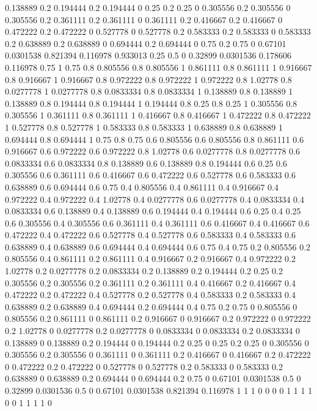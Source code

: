 0.138889 0.2
0.194444 0.2
0.194444 0
0.25 0.2
0.25 0
0.305556 0.2
0.305556 0
0.305556 0.2
0.361111 0.2
0.361111 0
0.361111 0.2
0.416667 0.2
0.416667 0
0.472222 0.2
0.472222 0
0.527778 0
0.527778 0.2
0.583333 0.2
0.583333 0
0.583333 0.2
0.638889 0.2
0.638889 0
0.694444 0.2
0.694444 0
0.75 0.2
0.75 0
0.67101 0.0301538
0.821394 0.116978
0.933013 0.25
0.5 0
0.32899 0.0301536
0.178606 0.116978
0.75 1
0.75 0.8
0.805556 0.8
0.805556 1
0.861111 0.8
0.861111 1
0.916667 0.8
0.916667 1
0.916667 0.8
0.972222 0.8
0.972222 1
0.972222 0.8
1.02778 0.8
0.0277778 1
0.0277778 0.8
0.0833334 0.8
0.0833334 1
0.138889 0.8
0.138889 1
0.138889 0.8
0.194444 0.8
0.194444 1
0.194444 0.8
0.25 0.8
0.25 1
0.305556 0.8
0.305556 1
0.361111 0.8
0.361111 1
0.416667 0.8
0.416667 1
0.472222 0.8
0.472222 1
0.527778 0.8
0.527778 1
0.583333 0.8
0.583333 1
0.638889 0.8
0.638889 1
0.694444 0.8
0.694444 1
0.75 0.8
0.75 0.6
0.805556 0.6
0.805556 0.8
0.861111 0.6
0.916667 0.6
0.972222 0.6
0.972222 0.8
1.02778 0.6
0.0277778 0.8
0.0277778 0.6
0.0833334 0.6
0.0833334 0.8
0.138889 0.6
0.138889 0.8
0.194444 0.6
0.25 0.6
0.305556 0.6
0.361111 0.6
0.416667 0.6
0.472222 0.6
0.527778 0.6
0.583333 0.6
0.638889 0.6
0.694444 0.6
0.75 0.4
0.805556 0.4
0.861111 0.4
0.916667 0.4
0.972222 0.4
0.972222 0.4
1.02778 0.4
0.0277778 0.6
0.0277778 0.4
0.0833334 0.4
0.0833334 0.6
0.138889 0.4
0.138889 0.6
0.194444 0.4
0.194444 0.6
0.25 0.4
0.25 0.6
0.305556 0.4
0.305556 0.6
0.361111 0.4
0.361111 0.6
0.416667 0.4
0.416667 0.6
0.472222 0.4
0.472222 0.6
0.527778 0.4
0.527778 0.6
0.583333 0.4
0.583333 0.6
0.638889 0.4
0.638889 0.6
0.694444 0.4
0.694444 0.6
0.75 0.4
0.75 0.2
0.805556 0.2
0.805556 0.4
0.861111 0.2
0.861111 0.4
0.916667 0.2
0.916667 0.4
0.972222 0.2
1.02778 0.2
0.0277778 0.2
0.0833334 0.2
0.138889 0.2
0.194444 0.2
0.25 0.2
0.305556 0.2
0.305556 0.2
0.361111 0.2
0.361111 0.4
0.416667 0.2
0.416667 0.4
0.472222 0.2
0.472222 0.4
0.527778 0.2
0.527778 0.4
0.583333 0.2
0.583333 0.4
0.638889 0.2
0.638889 0.4
0.694444 0.2
0.694444 0.4
0.75 0.2
0.75 0
0.805556 0
0.805556 0.2
0.861111 0
0.861111 0.2
0.916667 0
0.916667 0.2
0.972222 0
0.972222 0.2
1.02778 0
0.0277778 0.2
0.0277778 0
0.0833334 0
0.0833334 0.2
0.0833334 0
0.138889 0
0.138889 0.2
0.194444 0
0.194444 0.2
0.25 0
0.25 0.2
0.25 0
0.305556 0
0.305556 0.2
0.305556 0
0.361111 0
0.361111 0.2
0.416667 0
0.416667 0.2
0.472222 0
0.472222 0.2
0.472222 0
0.527778 0
0.527778 0.2
0.583333 0
0.583333 0.2
0.638889 0
0.638889 0.2
0.694444 0
0.694444 0.2
0.75 0
0.67101 0.0301538
0.5 0
0.32899 0.0301536
0.5 0
0.67101 0.0301538
0.821394 0.116978
1 1
1 0
0 0
0 1
1 1
1 0
0 1
1 1
1 0
